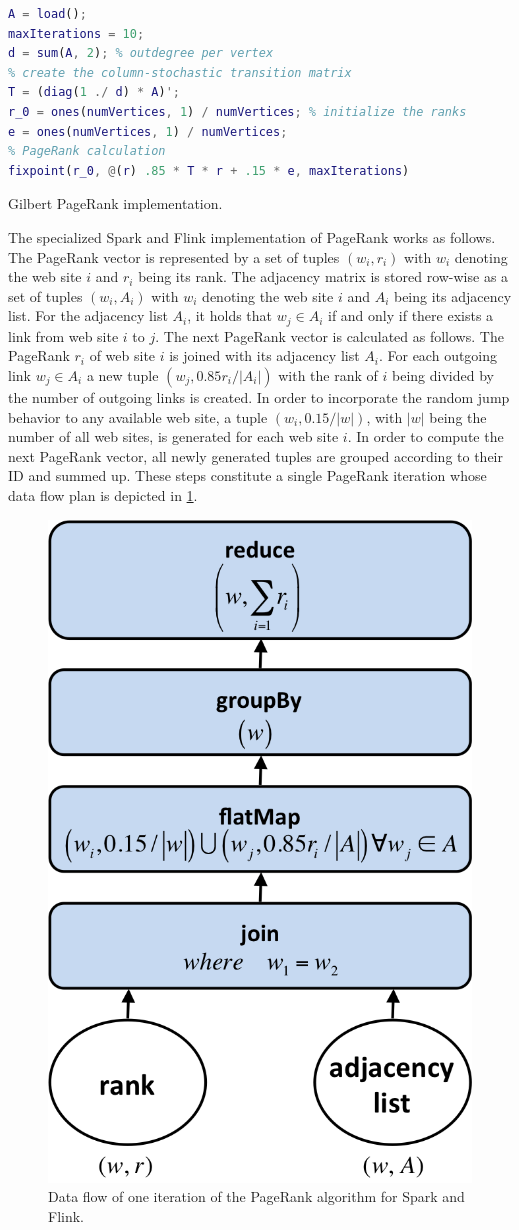 \begin{listing}[!h]
	\begin{CenteredBox}
		\begin{lstlisting}[language=Matlab,
		commentstyle=\color{black},
		  stringstyle=\color{black},
		  keywordstyle=\color{black}\bfseries,
		  morekeywords={ones, fixpoint},]
% load adjacency matrix
A = load();
maxIterations = 10;
d = sum(A, 2); % outdegree per vertex
% create the column-stochastic transition matrix
T = (diag(1 ./ d) * A)'; 
r_0 = ones(numVertices, 1) / numVertices; % initialize the ranks
e = ones(numVertices, 1) / numVertices;
% PageRank calculation
fixpoint(r_0, @(r) .85 * T * r + .15 * e, maxIterations)
		\end{lstlisting}
	\end{CenteredBox}
	\caption{Gilbert PageRank implementation.}
	\label{lst:gilbertPageRank}
\end{listing}

The specialized Spark and Flink implementation of PageRank works as follows.
The Page\-Rank vector is represented by a set of tuples $(w_i, r_i)$ with $w_i$ denoting the web site $i$ and $r_i$ being its rank.
The adjacency matrix is stored row-wise as a set of tuples $(w_i, A_i)$ with $w_i$ denoting the web site $i$ and $A_i$ being its adjacency list.
For the adjacency list $A_i$, it holds that $w_j \in A_i$ if and only if there exists a link from web site $i$ to $j$.
The next PageRank vector is calculated as follows.
The PageRank $r_i$ of web site $i$ is joined with its adjacency list $A_i$.
For each outgoing link $w_j \in A_i$ a new tuple $(w_j, 0.85r_i/\left|A_i\right|)$ with the rank of $i$ being divided by the number of outgoing links is created.
In order to incorporate the random jump behavior to any available web site, a tuple $(w_i, 0.15/|w|)$, with $|w|$ being the number of all web sites, is generated for each web site $i$.
In order to compute the next PageRank vector, all newly generated tuples are grouped according to their ID and summed up.
These steps constitute a single PageRank iteration whose data flow plan is depicted in \cref{fig:pageRankDataFlow}.

\begin{figure}[!h]
	\centering
	\includegraphics[width=.3\linewidth]{images/pageRankStep.png}
	\caption{Data flow of one iteration of the PageRank algorithm for Spark and Flink.}
	\label{fig:pageRankDataFlow}
\end{figure}

